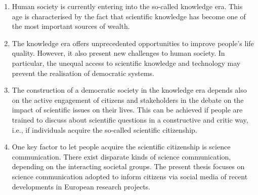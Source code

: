 \begin{enumerate}
 \item Human society is currently entering into the so-called knowledge era. This age is characterised by the fact that scientific knowledge has become one of the most important sources of wealth. 
 \item The knowledge era offers unprecedented opportunities to improve people's life quality. However, it also present new challenges to human society. In particular, the unequal access to scientific knowledge and technology may prevent the realisation of democratic systems.
 \item The construction of a democratic society in the knowledge era depends also on the active engagement of citizens and stakeholders in the debate on the impact of scientific issues on their lives. This can be achieved if people are trained to discuss about scientific questions in a constructive and critic way, i.e., if individuals acquire the so-called scientific citizenship.
 \item One key factor to let people acquire the scientific citizenship is science communication. There exist disparate kinds of science communication, depending on the interacting societal groups. The present thesis focuses on science communication adopted to inform citizens via social media of recent developments in European research projects.     
\end{enumerate}